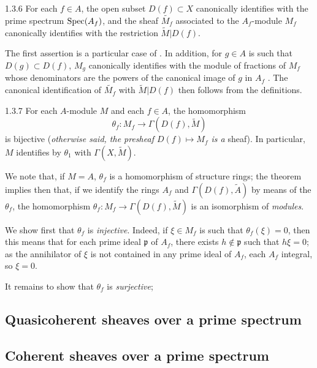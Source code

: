 \documentclass[10pt,oneside]{book}
\begin{document}
\begin{envs}[Proposition]{1.3.6}
\label{prop-1.1.3.6}
For each $f\in A$, the open subset $D(f)\subset X$ canonically identifies with the prime
spectrum ${\mathop{\mathrm{Spec}}\nolimits}(A_f)$, and the sheaf $\widetilde{M_f}$ associated to the $A_f$-module
$M_f$ canonically identifies with the restriction $\widetilde{M}|D(f)$.
\end{envs}

The first assertion is a particular case of . In addition, for $g\in A$ is
such that $D(g)\subset D(f)$, $M_g$ canonically identifies with the module of fractions of
$M_f$ whose denominators are the powers of the canonical image of $g$ in $A_f$
. The canonical identification of $\widetilde{M_f}$ with
$\widetilde{M}|D(f)$ then follows from the definitions.

\begin{envs}[Theorem]{1.3.7}
\label{thm-1.1.3.7}
For each $A$-module $M$ and each $f\in A$, the homomorphism
\[
  \theta_f:M_f\longrightarrow\Gamma(D(f),\widetilde{M})
\]
is bijective (\emph{otherwise said, the presheaf $D(f)\mapsto M_f$ is a} sheaf). In
particular, $M$ identifies by $\theta_1$ with $\Gamma(X,\widetilde{M})$.
\end{envs}

We note that, if $M=A$, $\theta_f$ is a homomorphism of structure rings; the theorem
 implies then that, if we identify the rings $A_f$ and
$\Gamma(D(f),\widetilde{A})$ by means of the $\theta_f$, the homomorphism
$\theta_f:M_f\to\Gamma(D(f),\widetilde{M})$ is an isomorphism of \emph{modules}.

We show first that $\theta_f$ is \emph{injective}. Indeed, if $\xi\in M_f$ is such that
$\theta_f(\xi)=0$, then this means that for each prime ideal $\mathfrak{p}$ of $A_f$, there
exists $h\not\in\mathfrak{p}$ such that $h\xi=0$; as the annihilator of $\xi$ is not
contained in any prime ideal of $A_f$, each $A_f$ integral, so $\xi=0$.

It remains to show that $\theta_f$ is \emph{surjective};

\subsection{Quasicoherent sheaves over a prime spectrum}
\label{1-schemes-1.4}

\subsection{Coherent sheaves over a prime spectrum}
\label{1-schemes-1.5}
\end{document}
